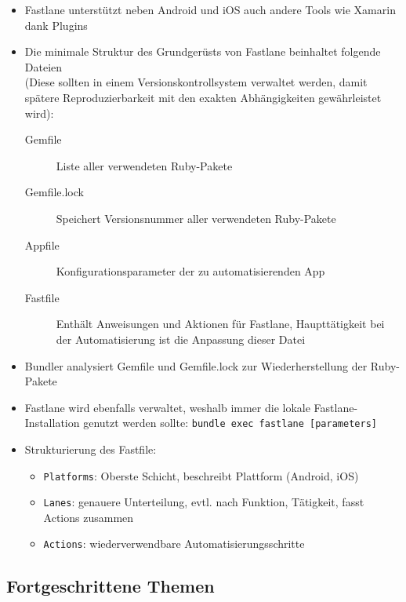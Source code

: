 \documentclass[a4paper]{article}
\begin{document}
		\begin{itemize}
			\item Fastlane unterstützt neben Android und iOS auch andere Tools wie Xamarin dank Plugins
			\item Die minimale Struktur des Grundgerüsts von Fastlane beinhaltet folgende Dateien \\
				(Diese sollten in einem Versionskontrollsystem verwaltet werden, damit spätere Reproduzierbarkeit mit den exakten Abhängigkeiten gewährleistet wird):			
			\begin{description}
				\item[Gemfile] Liste aller verwendeten Ruby-Pakete
				\item[Gemfile.lock] Speichert Versionsnummer aller verwendeten Ruby-Pakete
				\item[Appfile] Konfigurationsparameter der zu automatisierenden App
				\item[Fastfile] Enthält Anweisungen und Aktionen für Fastlane, Haupttätigkeit bei der Automatisierung ist die Anpassung dieser Datei
			\end{description}
			\item Bundler analysiert Gemfile und Gemfile.lock zur Wiederherstellung der Ruby-Pakete
			\item Fastlane wird ebenfalls verwaltet, weshalb immer die lokale Fastlane-Installation genutzt werden sollte: 
				\texttt{bundle exec fastlane [parameters]}
			\item Strukturierung des Fastfile:
			\begin{itemize}
				\item \texttt{Platforms}: Oberste Schicht, beschreibt Plattform (Android, iOS)
				\item \texttt{Lanes}: genauere Unterteilung, evtl. nach Funktion, Tätigkeit, fasst Actions zusammen
				\item \texttt{Actions}: wiederverwendbare Automatisierungsschritte
			\end{itemize}
		\end{itemize}
	
		\subsection{Fortgeschrittene Themen}
		
\end{document}

